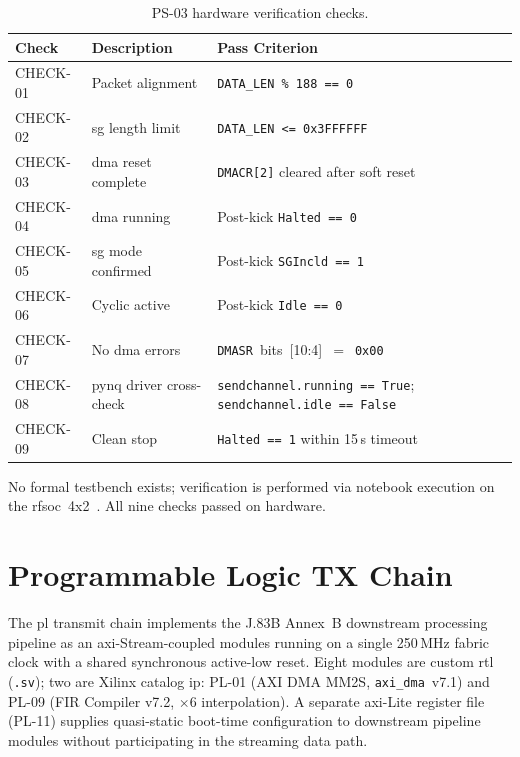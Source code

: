 \begin{table}[!h]
  \caption{PS-03 hardware verification checks.}
  \label{tab:ps03_checks}
  \centering
  \small
  \begin{tabular}{l p{4.5cm} p{6.4cm}}
    \hline
    Check & Description & Pass Criterion \\
    \hline
    CHECK-01
      & Packet alignment
      & \texttt{DATA\_LEN~\%~188~==~0} \\[2pt]
    CHECK-02
      & \ac{sg} length limit
      & \texttt{DATA\_LEN~<=~0x3FFFFFF} \\[2pt]
    CHECK-03
      & \ac{dma} reset complete
      & \texttt{DMACR[2]} cleared after soft reset \\[2pt]
    CHECK-04
      & \ac{dma} running
      & Post-kick \texttt{Halted~==~0} \\[2pt]
    CHECK-05
      & \ac{sg} mode confirmed
      & Post-kick \texttt{SGIncld~==~1} \\[2pt]
    CHECK-06
      & Cyclic active
      & Post-kick \texttt{Idle~==~0} \\[2pt]
    CHECK-07
      & No \ac{dma} errors
      & \texttt{DMASR}~bits~[10:4]~$=$~\texttt{0x00} \\[2pt]
    CHECK-08
      & \ac{pynq} driver cross-check
      & \texttt{sendchannel.running~==~True};
        \texttt{sendchannel.idle~==~False} \\[2pt]
    CHECK-09
      & Clean stop
      & \texttt{Halted~==~1} within 15\,s timeout \\
    \hline
  \end{tabular}
\end{table}
\FloatBarrier

No formal testbench exists; verification is performed via notebook
execution on the \ac{rfsoc}~4x2~\cite{PYNQ_DOC}.
All nine checks passed on hardware.

\clearpage 


\section{Programmable Logic TX Chain}
\label{sec:pl}

The \ac{pl} transmit chain implements the J.83B Annex~B downstream
processing pipeline as an \ac{axi}-Stream-coupled modules running on a
single 250\,MHz fabric clock with a shared synchronous active-low reset.
Eight modules are custom \ac{rtl} (\texttt{.sv}); two are Xilinx catalog
\ac{ip}: \mbox{PL-01} (AXI DMA MM2S, \texttt{axi\_dma}~v7.1) and
\mbox{PL-09} (FIR Compiler v7.2, ${\times}6$ interpolation).
A separate \ac{axi}-Lite register file (PL-11) supplies quasi-static
boot-time configuration to downstream pipeline modules without
participating in the streaming data path.

